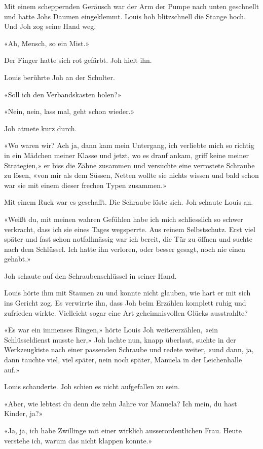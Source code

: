 Mit einem scheppernden Geräusch war der Arm der Pumpe nach unten
geschnellt und hatte Johs Daumen eingeklemmt. Louis hob blitzschnell die
Stange hoch. Und Joh zog seine Hand weg.

«Ah, Mensch, so ein Mist.»

Der Finger hatte sich rot gefärbt. Joh hielt ihn.

Louis berührte Joh an der Schulter.

«Soll ich den Verbandskasten holen?»

«Nein, nein, lass mal, geht schon wieder.»

Joh atmete kurz durch.

«Wo waren wir? Ach ja, dann kam mein Untergang, ich verliebte mich so
richtig in ein Mädchen meiner Klasse und jetzt, wo es drauf ankam, griff
keine meiner Strategien,» er biss die Zähne zusammen und versuchte eine
verrostete Schraube zu lösen, «von mir als dem Süssen, Netten wollte sie
nichts wissen und bald schon war sie mit einem dieser frechen Typen
zusammen.»

Mit einem Ruck war es geschafft. Die Schraube löste sich. Joh schaute
Louis an.

«Weißt du, mit meinen wahren Gefühlen habe ich mich schliesslich so
schwer verkracht, dass ich sie eines Tages wegsperrte. Aus reinem
Selbstschutz. Erst viel später und fast schon notfallmässig war ich
bereit, die Tür zu öffnen und suchte nach dem Schlüssel. Ich hatte ihn
verloren, oder besser gesagt, noch nie einen gehabt.»

Joh schaute auf den Schraubenschlüssel in seiner Hand.

Louis hörte ihm mit Staunen zu und konnte nicht glauben, wie hart er mit
sich ins Gericht zog. Es verwirrte ihn, dass Joh beim Erzählen komplett
ruhig und zufrieden wirkte. Vielleicht sogar eine Art geheimnisvollen
Glücks ausstrahlte?

«Es war ein immenses Ringen,» hörte Louis Joh weitererzählen, «ein
Schlüsseldienst musste her,» Joh lachte nun, knapp überlaut, suchte in
der Werkzeugkiste nach einer passenden Schraube und redete weiter, «und
dann, ja, dann tauchte viel, viel später, nein noch später, Manuela in
der Leichenhalle auf.»

Louis schauderte. Joh schien es nicht aufgefallen zu sein.

«Aber, wie lebtest du denn die zehn Jahre vor Manuela? Ich mein, du hast
Kinder, ja?»

«Ja, ja, ich habe Zwillinge mit einer wirklich ausserordentlichen Frau.
Heute verstehe ich, warum das nicht klappen konnte.»

